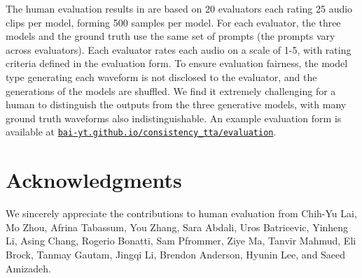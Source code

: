 \documentclass{article}
\begin{document}
The human evaluation results in  are based on 20 evaluators each rating 25 audio clips per model, forming 500 samples per model. For each evaluator, the three models and the ground truth use the same set of prompts (the prompts vary across evaluators). Each evaluator rates each audio on a scale of 1-5, with rating criteria defined in the evaluation form. To ensure evaluation fairness, the model type generating each waveform is not disclosed to the evaluator, and the generations of the models are shuffled. We find it extremely challenging for a human to distinguish the outputs from the three generative models, with many ground truth waveforms also indistinguishable. An example evaluation form is available at \href{https://bai-yt.github.io/consistency_tta/evaluation.html}{\texttt{bai-yt.github.io/consistency\_tta/evaluation}}.



\section{Acknowledgments}

We sincerely appreciate the contributions to human evaluation from Chih-Yu Lai, Mo Zhou, Afrina Tabassum, You Zhang, Sara Abdali, Uros Batricevic, Yinheng Li, Asing Chang, Rogerio Bonatti, Sam Pfrommer, Ziye Ma, Tanvir Mahmud, Eli Brock, Tanmay Gautam, Jingqi Li, Brendon Anderson, Hyunin Lee, and Saeed Amizadeh.
\end{document}
